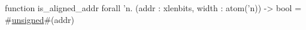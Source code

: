 function is_aligned_addr forall 'n. (addr : xlenbits, width : atom('n)) -> bool =
  #\hyperref[sailRISCVzunsigned]{unsigned}#(addr) %
